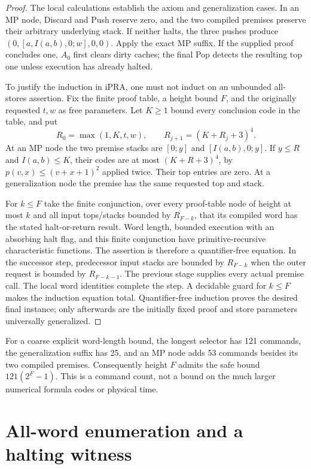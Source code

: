 \documentclass[11pt,a4paper]{article}
\newcommand{\ipra}{\mathrm{iPRA}}
\begin{document}
\begin{proof}
The local calculations establish the axiom and generalization cases.
In an MP node, Discard and Push reserve zero, and the two compiled
premises preserve their arbitrary underlying stack. If neither
halts, the three pushes produce
$(0,[a,I(a,b),0;w],0,0)$. Apply the exact MP suffix. If the supplied
proof concludes one, $A_0$ first clears dirty caches; the final Pop
detects the resulting top one unless execution has already halted.

To justify the induction in $\ipra$, one must not induct on an
unbounded all-stores assertion. Fix the finite proof table,
a height bound $F$, and the originally requested $t,w$ as free
parameters. Let $K\ge1$ bound every conclusion code in the table, and
put
\[
 R_0=\max(1,K,t,w),\qquad R_{j+1}=(K+R_j+3)^4.
\]
At an MP node the two premise stacks are $[0;y]$ and
$[I(a,b),0;y]$. If $y\le R$ and $I(a,b)\le K$, their codes are
at most $(K+R+3)^4$, by
$p(v,x)\le(v+x+1)^2$ applied twice. Their top entries are zero.
At a generalization node the premise has the same requested top and
stack.

For $k\le F$ take the finite conjunction, over every proof-table
node of height at most $k$ and all input tops/stacks bounded by
$R_{F-k}$, that its compiled word has the stated halt-or-return
result. Word length, bounded execution with an absorbing halt flag,
and this finite conjunction have primitive-recursive characteristic
functions. The assertion is therefore a quantifier-free equation.
In the successor step, predecessor input stacks are bounded by
$R_{F-k}$ when the outer request is bounded by $R_{F-k-1}$.
The previous stage supplies every actual premise call. The local
word identities complete the step. A decidable guard for $k\le F$
makes the induction equation total. Quantifier-free induction
proves the desired final instance; only afterwards are the initially
fixed proof and store parameters universally generalized.
\end{proof}

For a coarse explicit word-length bound, the longest selector has
121 commands, the generalization suffix has 25, and an MP node adds
53 commands besides its two compiled premises. Consequently height
$F$ admits the safe bound $121(2^F-1)$. This is a command count, not a
bound on the much larger numerical formula codes or physical time.

\section{All-word enumeration and a halting witness}
\label{sec:scheduler}
\end{document}

